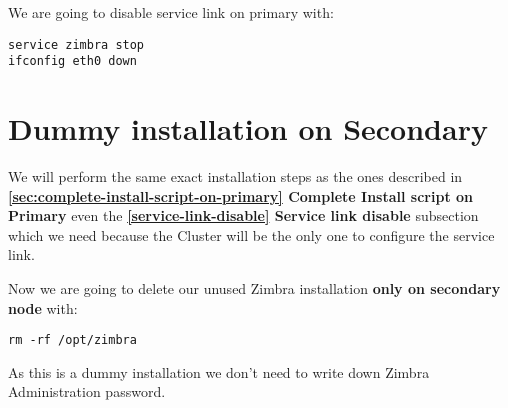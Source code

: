 We are going to disable service link on primary with:
\begin{verbatim}
service zimbra stop
ifconfig eth0 down
\end{verbatim}

\section {Dummy installation on Secondary}
We will perform the same exact installation steps as the ones described in 
\textbf{\ref{sec:complete-install-script-on-primary} Complete Install script on Primary} even the \textbf{\ref{service-link-disable} Service link disable} subsection which we need because the Cluster will be the only one to configure the service link.

Now we are going to delete our unused Zimbra installation \textbf{only on secondary node} with:
\begin{verbatim}
rm -rf /opt/zimbra
\end{verbatim}

As this is a dummy installation we don't need to write down Zimbra Administration password.